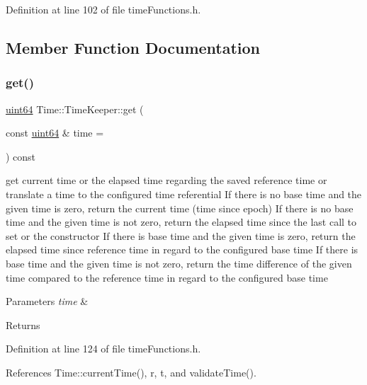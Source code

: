 Definition at line 102 of file time\+Functions.\+h.



\subsection{Member Function Documentation}
\mbox{\label{classTime_1_1TimeKeeper_a1cb3ff75c82149d1d8fc19bd91d0dec7}} 
\subsubsection{\texorpdfstring{get()}{get()}}
{\footnotesize\ttfamily \hyperlink{systemDefines_8h_abc0f5bc07737e498f287334775dff2b6}{uint64} Time\+::\+Time\+Keeper\+::get (\begin{DoxyParamCaption}\item[{const \hyperlink{systemDefines_8h_abc0f5bc07737e498f287334775dff2b6}{uint64} \&}]{time = {} }\end{DoxyParamCaption}) const\hspace{0.3cm}{\ttfamily [inline]}}

get current time or the elapsed time regarding the saved reference time or translate a time to the configured time referential If there is no base time and the given time is zero, return the current time (time since epoch) If there is no base time and the given time is not zero, return the elapsed time since the last call to set or the constructor If there is base time and the given time is zero, return the elapsed time since reference time in regard to the configured base time If there is base time and the given time is not zero, return the time difference of the given time compared to the reference time in regard to the configured base time


\begin{DoxyParams}{Parameters}
{\em time} & \\
\hline
\end{DoxyParams}
\begin{DoxyReturn}{Returns}

\end{DoxyReturn}


Definition at line 124 of file time\+Functions.\+h.



References Time\+::current\+Time(), r, t, and validate\+Time().

